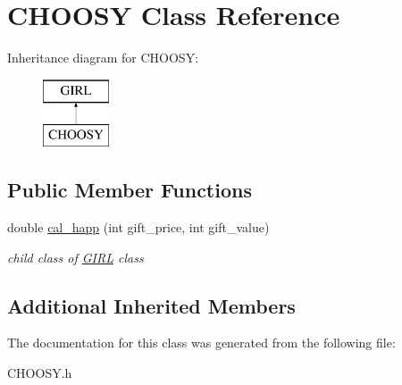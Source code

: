 \hypertarget{classCHOOSY}{}\section{C\+H\+O\+O\+SY Class Reference}
\label{classCHOOSY}
Inheritance diagram for C\+H\+O\+O\+SY\+:\begin{figure}[H]
\begin{center}
\leavevmode
\includegraphics[height=2.000000cm]{classCHOOSY}
\end{center}
\end{figure}
\subsection*{Public Member Functions}
\begin{DoxyCompactItemize}
\item 
\mbox{\label{classCHOOSY_a002ab00256ec849228b25d95dd4e0526}} 
double \hyperlink{classCHOOSY_a002ab00256ec849228b25d95dd4e0526}{cal\+\_\+happ} (int gift\+\_\+price, int gift\+\_\+value)
\begin{DoxyCompactList}\small\item\em child class of \hyperlink{classGIRL}{G\+I\+RL} class \end{DoxyCompactList}\end{DoxyCompactItemize}
\subsection*{Additional Inherited Members}


The documentation for this class was generated from the following file\+:\begin{DoxyCompactItemize}
\item 
C\+H\+O\+O\+S\+Y.\+h\end{DoxyCompactItemize}
